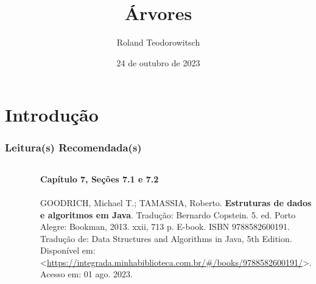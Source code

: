 \documentclass[aspectratio=169]{beamer}
\title[\sc{Árvores}]{Árvores}
\author[Roland Teodorowitsch]{Roland Teodorowitsch}
\institute[ALEST I - EP - PUCRS]{Algoritmos e Estruturas de Dados I - Escola Politécnica - PUCRS}
\date{24 de outubro de 2023}
\begin{document}
\justifying

\begin{frame}
	\titlepage
\end{frame}

\section{Introdução}

\begin{frame}\frametitle{Leitura(s) Recomendada(s)}

\begin{columns}[T]
\begin{column}{0.15\linewidth}
\vspace{-3mm}
\begin{figure}[h]
	\centering
	\includegraphics[height=0.3\paperheight]{imagens/livro_goodrich.jpg}
\end{figure}
\end{column}
\begin{column}{0.85\linewidth}
\tiny{\textbf{Capítulo 7, Seções 7.1 e 7.2}\\
~}\\
\scriptsize{GOODRICH, Michael T.; TAMASSIA, Roberto. \textbf{Estruturas de dados e algoritmos em Java}. Tradução: Bernardo Copstein. 5. ed. Porto Alegre: Bookman, 2013. xxii, 713 p. E-book. ISBN 9788582600191. Tradução de: Data Structures and Algorithms in Java, 5th Edition. Disponível em: \textless{}\url{https://integrada.minhabiblioteca.com.br/\#/books/9788582600191/}\textgreater{}. Acesso em: 01 ago. 2023.}
\end{column}
\end{columns}

\end{frame}

\end{document}
